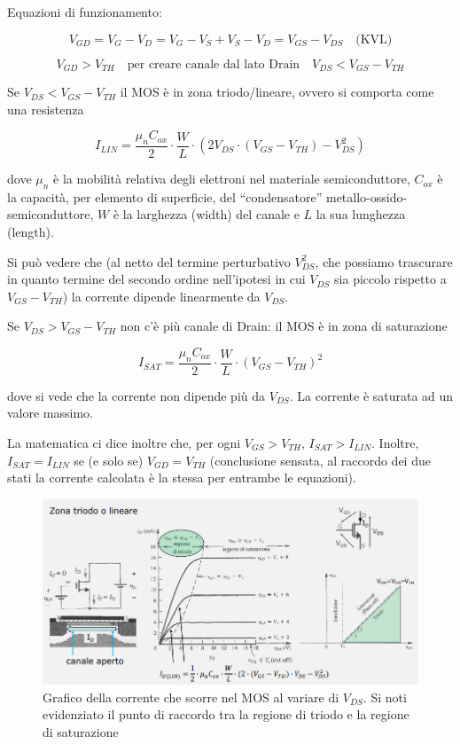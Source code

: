 \documentclass{article}
\begin{document}
Equazioni di funzionamento:

\[V_{GD} = V_G - V_D = V_G - V_S + V_S - V_D = V_{GS} - V_{DS} \quad \textrm {(KVL)}\]

\[V_{GD} > V_{TH} \quad \textrm{per creare canale dal lato Drain} \quad V_{DS} < V_{GS} - V_{TH}\]

Se $V_{DS} < V_{GS} - V_{TH}$ il MOS è in zona triodo/lineare, ovvero si comporta come una resistenza

\[I_{LIN} = \frac{\mu _n C_{ox}}{2} \cdot \frac{W}{L} \cdot (2V_{DS} \cdot (V_{GS} - V_{TH}) - V_{DS}^2)\]

dove $\mu _n$ è la mobilità relativa degli elettroni nel materiale semiconduttore, $C_{ox}$ è la capacità, per elemento di superficie, del ``condensatore'' metallo-ossido-semiconduttore, $W$ è la larghezza (width) del canale e $L$ la sua lunghezza (length). 

\vspace{1mm}

Si può vedere che (al netto del termine perturbativo $V_{DS}^2$, che possiamo trascurare in quanto termine del secondo ordine nell'ipotesi in cui $V_{DS}$ sia piccolo rispetto a $V_{GS} - V_{TH}$) la corrente dipende linearmente da $V_{DS}$. 

\vspace{3mm}

Se $V_{DS} > V_{GS} - V_{TH}$ non c'è più canale di Drain: il MOS è in zona di saturazione

\[I_{SAT} = \frac{\mu _n C_{ox}}{2} \cdot \frac{W}{L} \cdot (V_{GS} - V_{TH})^2\]

dove si vede che la corrente non dipende più da $V_{DS}$. La corrente è saturata ad un valore massimo.

\vspace{3mm}

La matematica ci dice inoltre che, per ogni $V_{GS} > V_{TH}$, $I_{SAT} > I_{LIN}$. Inoltre, $I_{SAT} = I_{LIN}$ se (e solo se) $V_{GD} = V_{TH}$ (conclusione sensata, al raccordo dei due stati la corrente calcolata è la stessa per entrambe le equazioni).

\begin{figure}[h]
  \centering
  \includegraphics[scale=0.7]{IM_MOS_grafici}
  \caption{Grafico della corrente che scorre nel MOS al variare di $V_{DS}$. Si noti evidenziato il punto di raccordo tra la regione di triodo e la regione di saturazione}
  \label{Schema_MOS_grafici}
\end{figure}
\clearpage
\end{document}
